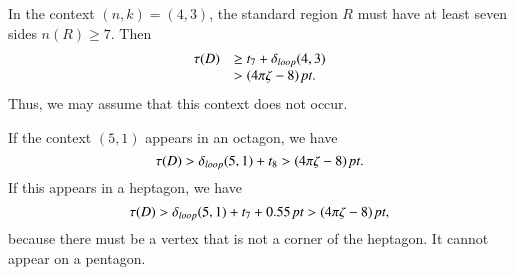In the context $(n,k)=(4,3)$, the standard region $R$ must have at
least seven sides $n(R)\ge7$.   Then
    $$
    \begin{array}{lll}
    \tau(D)&\ge t_7+{\delta}_{loop}(4,3)\\
            &>(4\pi\zeta-8)\,\hbox{\it pt}.
    \end{array}
    $$
Thus, we may assume that this context does not occur.

If the context $(5,1)$ appears in an octagon, we have
    $$\tau(D) >{\delta}_{loop}(5,1)+t_8>(4\pi\zeta-8)\,\hbox{\it pt}.$$
If this appears in a heptagon, we have
$$\tau(D) >{\delta}_{loop}(5,1) + t_7+ 0.55\,\hbox{\it pt} > (4\pi\zeta-8)\,\hbox{\it pt},$$
because there must be a vertex that is not a corner of the
heptagon. It cannot appear on a pentagon.



